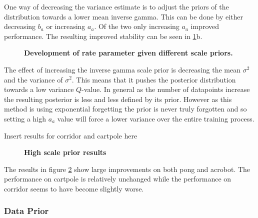 One way of decreasing the variance estimate is to adjust the priors of the distribution towards a lower mean inverse gamma. This can be done by either decreasing $b_a$ or increasing $a_a$. Of the two only increasing $a_a$ improved performance. The resulting improved stability can be seen in \ref{fig:scale_stability}b.

\begin{figure}[H]
    \centering
    \caption{\textbf{Development of rate parameter given different scale priors.}}
    \label{fig:scale_stability}
\end{figure}

The effect of increasing the inverse gamma scale prior is decreasing the mean $\sigma^2$ and the variance of $\sigma^2$. This means that it pushes the posterior distribution towards a low variance $Q$-value. In general as the number of datapoints increase the resulting posterior is less and less defined by its prior. However as this method is using exponential forgetting the prior is never truly forgotten and so setting a high $a_a$ value will force a lower variance over the entire training process.

\todo Insert results for corridor and cartpole here

\begin{figure}[H] 
    \centering 
    \caption{\textbf{High scale prior results}} 
    \label{fig:high_scale} 
\end{figure}

The results in figure \ref{fig:high_scale} show large improvements on both pong and acrobot. The performance on cartpole is relatively unchanged while the performance on corridor seems to have become slightly worse.

\subsubsection{Data Prior}

